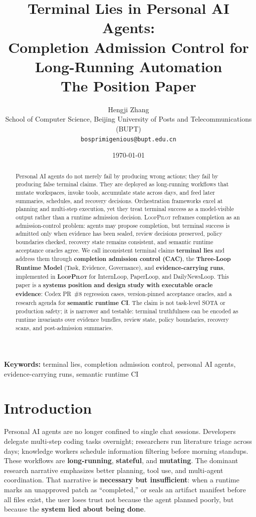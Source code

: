 \documentclass[11pt]{article}
\title{%
  Terminal Lies in Personal AI Agents:\\
  Completion Admission Control for Long-Running Automation\\[0.4em]
  \large The \looppilot{} Position Paper
}
\author{%
  Hengji Zhang \\
  School of Computer Science, Beijing University of Posts and Telecommunications (BUPT) \\
  \texttt{bosprimigenious@bupt.edu.cn}
}
\date{\today}
\newcommand{\looppilot}{\textsc{LoopPilot}}
\newcommand{\cac}{\textsc{CAC}}
\begin{document}
\maketitle

\begin{abstract}
Personal AI agents do not merely fail by producing wrong actions; they fail by producing false terminal claims.
They are deployed as long-running workflows that mutate workspaces, invoke tools, accumulate state across days, and feed later summaries, schedules, and recovery decisions.
Orchestration frameworks excel at planning and multi-step execution, yet they treat terminal success as a model-visible output rather than a runtime admission decision.
\looppilot{} reframes completion as an admission-control problem: agents may propose completion, but terminal success is admitted only when evidence has been sealed, review decisions preserved, policy boundaries checked, recovery state remains consistent, and semantic runtime acceptance oracles agree.
We call inconsistent terminal claims \textbf{terminal lies} and address them through \textbf{completion admission control (\cac{})}, the \textbf{Three-Loop Runtime Model} (Task, Evidence, Governance), and \textbf{evidence-carrying runs}, implemented in \textbf{\looppilot{}} for InternLoop, PaperLoop, and DailyNewsLoop.
This paper is a \textbf{systems position and design study with executable oracle evidence}: Codex PR~\#8 regression cases, version-pinned acceptance oracles, and a research agenda for \textbf{semantic runtime CI}.
The claim is not task-level SOTA or production safety; it is narrower and testable: terminal truthfulness can be encoded as runtime invariants over evidence bundles, review state, policy boundaries, recovery scans, and post-admission summaries.
\end{abstract}

\noindent\textbf{Keywords:} terminal lies, completion admission control, personal AI agents, evidence-carrying runs, semantic runtime CI

\section{Introduction}
\label{sec:introduction}

Personal AI agents are no longer confined to single chat sessions.
Developers delegate multi-step coding tasks overnight; researchers run literature triage across days; knowledge workers schedule information filtering before morning standups.
These workflows are \textbf{long-running}, \textbf{stateful}, and \textbf{mutating}.
The dominant research narrative emphasizes better planning, tool use, and multi-agent coordination.
That narrative is \textbf{necessary but insufficient}: when a runtime marks an unapproved patch as ``completed,'' or seals an artifact manifest before all files exist, the user loses trust not because the agent planned poorly, but because the \textbf{system lied about being done}.
\end{document}
